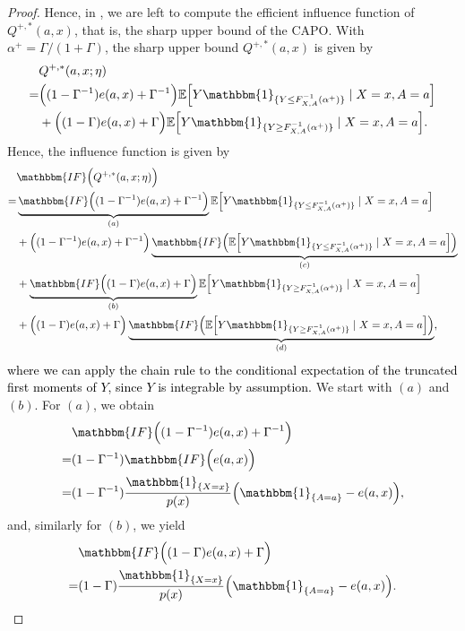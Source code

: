 \documentclass{article} %
\theoremstyle{plain}
\theoremstyle{definition}
\theoremstyle{remark}
\newcommand{\Q}{F_{X,A}^{-1}}
\newcommand{\IndL}{\mathbbm{1}_{\{Y\leq \Q({\alpha^+})\}}}
\newcommand{\IndG}{\mathbbm{1}_{\{Y\geq \Q({\alpha^+})\}}}
\newcommand{\f}{\mathbbm{IF}}
\newcommand{\rebuttal}[1]{\textcolor{black}{#1}}
\begin{document}
\begin{proof}
Hence, in , we are left to compute the efficient influence function of $Q^{+,*}(a,x)$, that is, the sharp upper bound of the CAPO. With ${\alpha^+}=\Gamma/(1+\Gamma)$, the sharp upper bound $Q^{+,*}(a,x)$ is given by
\begin{align}
    &Q^{+,*}(a,x;\eta)\\
    =& \Big( (1-\Gamma^{-1}) e(a, x) +\Gamma^{-1} \Big) \mathbb{E}\Big[ Y \IndL \mid X=x, A=a \Big]\\
        &+ \Big( (1-\Gamma) e(a, x) +\Gamma \Big) \mathbb{E}\Big[ Y \IndG \mid X=x, A=a \Big].
\end{align}
Hence, the influence function is given by
\begin{align}
    &\f \Big( Q^{+,*}(a,x;\eta)\Big) \\
    =& \underbrace{\f\Big( (1-\Gamma^{-1}) e(a, x) +\Gamma^{-1} \Big)}_{(a)} \mathbb{E}\Big[ Y \IndL \mid X=x, A=a \Big]\\
    &+ \Big( (1-\Gamma^{-1}) e(a, x) +\Gamma^{-1} \Big) \underbrace{\f\Big(\mathbb{E}\Big[ Y \IndL \mid X=x, A=a \Big]\Big)}_{(c)} \\
    &+ \underbrace{\f\Big( (1-\Gamma) e(a, x) +\Gamma \Big)}_{(b)} \mathbb{E}\Big[ Y \IndG \mid X=x, A=a \Big]\\
    &+ \Big( (1-\Gamma) e(a, x) +\Gamma \Big) \underbrace{\f\Big(\mathbb{E}\Big[ Y \IndG \mid X=x, A=a \Big]\Big)}_{(d)},
\end{align}
\rebuttal{where we can apply the chain rule to the conditional expectation of the truncated first moments of $Y$, since $Y$ is integrable by assumption.}
We start with $(a)$ and $(b)$. For $(a)$, we obtain
\begin{align}
    &\f\Big( (1-\Gamma^{-1}) e(a, x) +\Gamma^{-1} \Big)\\
    =& (1-\Gamma^{-1}) \f\Big( e(a, x)\Big)\\
    =& (1-\Gamma^{-1}) \frac{\mathbbm{1}_{\{X=x\}}}{p(x)}\Big( \mathbbm{1}_{\{A=a\}}-e(a, x)\Big),\label{eq:if_a}
\end{align}
and, similarly for $(b)$, we yield
\begin{align}
    &\f\Big( (1-\Gamma) e(a, x) +\Gamma \Big)\\
    =& (1-\Gamma) \frac{\mathbbm{1}_{\{X=x\}}}{p(x)}\Big( \mathbbm{1}_{\{A=a\}}-e(a, x)\Big).\label{eq:if_b}
\end{align}




\end{proof}
\end{document}
